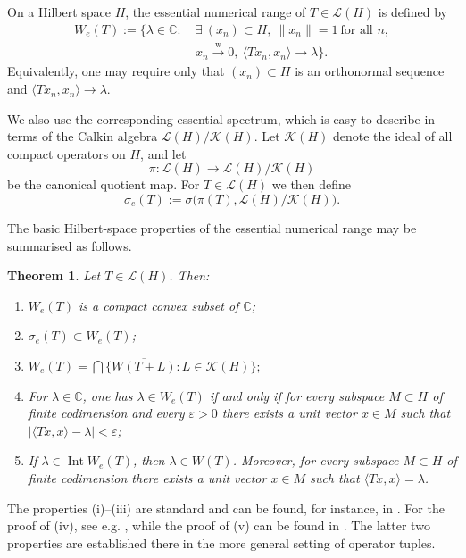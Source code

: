 \documentclass[11pt]{amsart}
\numberwithin{equation}{section}
\newtheorem{theorem}{Theorem}[section]
\theoremstyle{definition}
\theoremstyle{remark}
\newcommand{\C}{\mathbb{C}}
\newcommand{\ip}[2]{\langle #1,#2\rangle}
\newcommand{\e}{\varepsilon}
\newcommand{\wto}{\xrightarrow{\mathrm w}}
\begin{document}
On a Hilbert space $H$, the essential numerical range of $T\in \mathcal L(H)$ is defined by
\[
\begin{split}
W_e(T):=\{\lambda\in\C: &\ \exists\ (x_n)\subset H,\ \|x_n\|=1\ \text{for all }n,\\
&\ x_n\wto0,\ \ip{Tx_n}{x_n}\to\lambda\}.
\end{split}
\]
Equivalently, one may require only that 
$(x_n)\subset H$ is an orthonormal sequence 
 and $\ip{Tx_n}{x_n}\to\lambda$.

We also use the corresponding essential spectrum,  which is easy to describe in terms of the Calkin algebra $\mathcal L(H)/\mathcal K(H).$ Let $\mathcal K(H)$ denote the ideal of all compact operators on $H$, and let
\[
\pi:\mathcal L(H)\to \mathcal L(H)/\mathcal K(H)
\]
be the canonical quotient map. For $T\in \mathcal L(H)$ we then define
\[
\sigma_e(T):=\sigma\bigl(\pi(T),\mathcal L(H)/\mathcal K(H)\bigr).
\]

The basic Hilbert-space properties of the essential numerical range may be summarised as follows. 

\begin{theorem}\label{hilbertwe}
Let $T\in \mathcal L(H)$.
Then:
\begin{enumerate}[label=\textup{(\roman*)}]
\item $W_e(T)$ is a compact convex subset of $\C$;
\item $\sigma_e(T)\subset W_e(T)$;
\item $W_e(T)=\bigcap\{\overline{W(T+L)}: L\in \mathcal K(H)\};$
\item For \(\lambda\in\C\), one has $\lambda\in W_e(T)$ if and only if for every subspace $M\subset H$ of finite codimension and every $\e>0$ there exists a unit vector $x\in M$ such that $|\langle Tx,x\rangle-\lambda|<\e$;
\item If \(\lambda\in\operatorname{Int} W_e(T)\), then \(\lambda\in W(T)\). Moreover, for every subspace $M\subset H$ of finite codimension there exists a unit vector $x\in M$ such that $\langle Tx,x\rangle=\lambda$.

\end{enumerate}
\end{theorem}
The properties (i)--(iii) are standard and can be found, for instance, in
\cite[Chapter~4.2]{GW}. For the proof of (iv), see e.g.
\cite[Lemma~4.1]{MT-circles}, while the proof of (v) can be found in
\cite[Corollary~4.2]{MT-jointnr}. The latter two properties are established
there in the more general setting of operator tuples.
\end{document}
